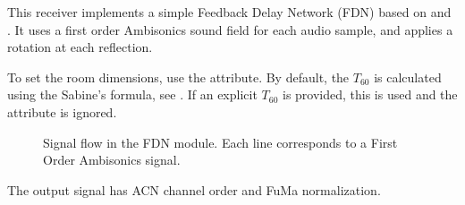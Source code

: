 This receiver implements a simple Feedback Delay Network (FDN) based
on \citet{Schroeder1962} and \citet{Rocchesso1997}. It uses a first
order Ambisonics sound field for each audio sample, and applies a
rotation at each reflection.

To set the room
dimensions, use the  attribute. By default, the
$T_{60}$ is calculated using the Sabine's formula, see
. If an explicit $T_{60}$ is provided, this is used
and the  attribute is ignored.

\begin{figure}[htb]
\centering
{}
\caption{Signal flow in the FDN module. Each line corresponds to a First Order Ambisonics signal.}
\label{fig:fdn}
\end{figure}



The output signal has ACN channel order and FuMa normalization.
